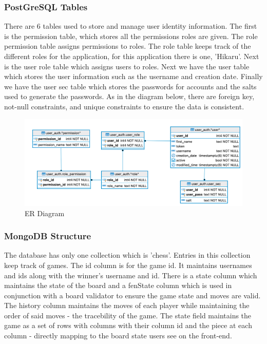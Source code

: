\documentclass[12pt]{article}
\begin{document}
\subsubsection{PostGreSQL Tables}
There are 6 tables used to store and manage user identity information. The first is the permission table, which stores all 
the permissions roles are given. The role permission table assigns permissions to roles. The role table keeps track of the different 
roles for the application, for this application there is one, 'Hikaru'. Next is the user role table which assigns users to roles. 
Next we have the  user table which stores the user information such as the username and creation date. Finally we have the user sec 
table which stores the passwords for accounts and the salts used to generate the passwords. As in the diagram below, there are 
foreign key, not-null constraints, and unique constraints to ensure the data is consistent.
\begin{figure}[h!]
    \includegraphics[width=\linewidth]{postgres.png}
    \caption{ER Diagram}
\end{figure}

\subsubsection{MongoDB Structure}
The database has only one collection which is 'chess'. Entries in this collection keep track of games. The id column is for the game id. It maintains usernames and ids along with the winner's username and id. There is a state column which maintains the state of the board and a fenState column which is used in conjunction with a board validator to ensure the game state and moves are valid. The history column maintains the moves of each player while maintaining the order of said moves - the tracebility of the game. 
The state field maintains the game as a set of rows with columns with their column id and the piece at each column - directly mapping to the board state users see on the front-end.
\end{document}
